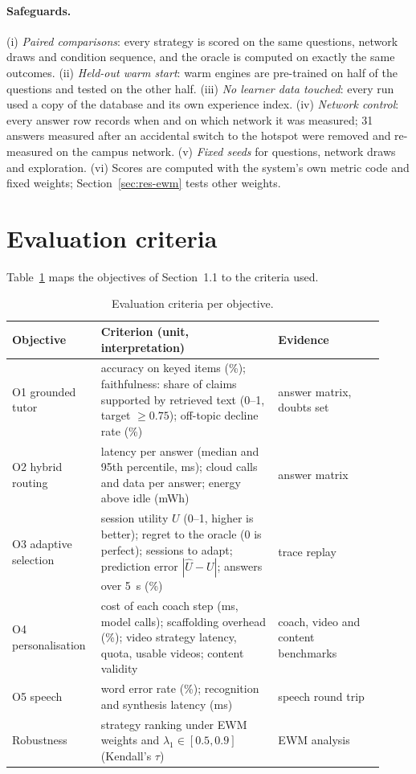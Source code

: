 \paragraph{Safeguards.} (i) \emph{Paired comparisons}: every strategy is scored on the same questions,
network draws and condition sequence, and the oracle is computed on exactly the same outcomes. (ii)
\emph{Held-out warm start}: warm engines are pre-trained on half of the questions and tested on the other
half. (iii) \emph{No learner data touched}: every run used a copy of the database and its own experience
index. (iv) \emph{Network control}: every answer row records when and on which network it was measured;
31 answers measured after an accidental switch to the hotspot were removed and re-measured on the campus
network. (v) \emph{Fixed seeds} for questions, network draws and exploration. (vi) Scores are computed with
the system's own metric code and fixed weights; Section~\ref{sec:res-ewm} tests other weights.

\section{Evaluation criteria}
\label{sec:criteria}

Table~\ref{tab:criteria} maps the objectives of Section~1.1 to the criteria used.

\begin{table}[htbp]
  \centering
  \caption{Evaluation criteria per objective.}
  \label{tab:criteria}
  \begin{tabular}{p{0.2\linewidth}p{0.45\linewidth}p{0.27\linewidth}}
    \toprule
    Objective & Criterion (unit, interpretation) & Evidence \\
    \midrule
    O1 grounded tutor & accuracy on keyed items (\%); faithfulness: share of claims supported by retrieved
      text (0--1, target $\geq 0.75$); off-topic decline rate (\%) & answer matrix, doubts set \\
    O2 hybrid routing & latency per answer (median and 95th percentile, ms); cloud calls and data per
      answer; energy above idle (mWh) & answer matrix \\
    O3 adaptive selection & session utility $U$ (0--1, higher is better); regret to the oracle (0 is
      perfect); sessions to adapt; prediction error $|\hat U-U|$; answers over 5~s (\%) & trace replay \\
    O4 personalisation & cost of each coach step (ms, model calls); scaffolding overhead (\%); video
      strategy latency, quota, usable videos; content validity & coach, video and content benchmarks \\
    O5 speech & word error rate (\%); recognition and synthesis latency (ms) & speech round trip \\
    Robustness & strategy ranking under EWM weights and $\lambda_1\in[0.5,0.9]$ (Kendall's $\tau$) &
      EWM analysis \\
    \bottomrule
  \end{tabular}
\end{table}

